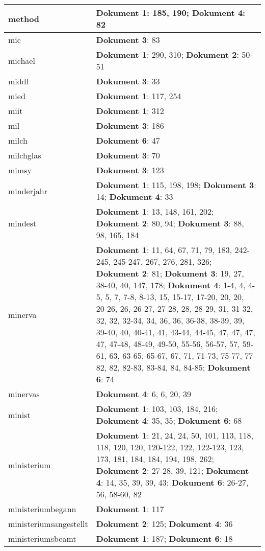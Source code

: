 \documentclass[a5paper]{article}
\begin{document}
\begin{longtable}[l]{|l|p{3in}|}
method & \textbf{Dokument 1}: 185, 190; \textbf{Dokument 4}: 82 \\
\hline
mic & \textbf{Dokument 3}: 83 \\
\hline
michael & \textbf{Dokument 1}: 290, 310; \textbf{Dokument 2}: 50-51 \\
\hline
middl & \textbf{Dokument 3}: 33 \\
\hline
mied & \textbf{Dokument 1}: 117, 254 \\
\hline
miit & \textbf{Dokument 1}: 312 \\
\hline
mil & \textbf{Dokument 3}: 186 \\
\hline
milch & \textbf{Dokument 6}: 47 \\
\hline
milchglas & \textbf{Dokument 3}: 70 \\
\hline
mimsy & \textbf{Dokument 3}: 123 \\
\hline
minderjahr & \textbf{Dokument 1}: 115, 198, 198; \textbf{Dokument 3}: 14; \textbf{Dokument 4}: 33 \\
\hline
mindest & \textbf{Dokument 1}: 13, 148, 161, 202; \textbf{Dokument 2}: 80, 94; \textbf{Dokument 3}: 88, 98, 165, 184 \\
\hline
minerva & \textbf{Dokument 1}: 11, 64, 67, 71, 79, 183, 242-245, 245-247, 267, 276, 281, 326; \textbf{Dokument 2}: 81; \textbf{Dokument 3}: 19, 27, 38-40, 40, 147, 178; \textbf{Dokument 4}: 1-4, 4, 4-5, 5, 7, 7-8, 8-13, 15, 15-17, 17-20, 20, 20, 20-26, 26, 26-27, 27-28, 28, 28-29, 31, 31-32, 32, 32, 32-34, 34, 36, 36, 36-38, 38-39, 39, 39-40, 40, 40-41, 41, 43-44, 44-45, 47, 47, 47, 47, 47-48, 48-49, 49-50, 55-56, 56-57, 57, 59-61, 63, 63-65, 65-67, 67, 71, 71-73, 75-77, 77-82, 82, 82-83, 83-84, 84, 84-85; \textbf{Dokument 6}: 74 \\
\hline
minervas & \textbf{Dokument 4}: 6, 6, 20, 39 \\
\hline
minist & \textbf{Dokument 1}: 103, 103, 184, 216; \textbf{Dokument 4}: 35, 35; \textbf{Dokument 6}: 68 \\
\hline
ministerium & \textbf{Dokument 1}: 21, 24, 24, 50, 101, 113, 118, 118, 120, 120, 120-122, 122, 122-123, 123, 173, 181, 184, 184, 194, 198, 262; \textbf{Dokument 2}: 27-28, 39, 121; \textbf{Dokument 4}: 14, 35, 39, 39, 43; \textbf{Dokument 6}: 26-27, 56, 58-60, 82 \\
\hline
ministeriumbegann & \textbf{Dokument 1}: 117 \\
\hline
ministeriumsangestellt & \textbf{Dokument 2}: 125; \textbf{Dokument 4}: 36 \\
\hline
ministeriumsbeamt & \textbf{Dokument 1}: 187; \textbf{Dokument 6}: 18 \\

\end{longtable}
\end{document}

